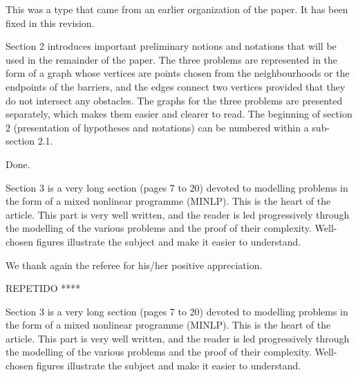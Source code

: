 \documentclass{article}
\newenvironment{reviewer}{\setcounter{pointcounter}{1}}{}
\newcommand{\point}{\text{{\selectfont \thepointcounter} \stepcounter{pointcounter}}}
\newcommand{\JP}[1]{{\color{blue}#1}}
\begin{document}
\begin{reviewer}
		\begin{tcolorbox}[breakable,enhanced,coltitle=black,colback=green!5!white,colframe=green!75!black,title=\textbf{Answer R2.\point},borderline={1pt}{0pt}{black},boxrule=0pt]
		This was a type that came from an earlier organization of the paper. It has been fixed in this revision.

		\end{tcolorbox}
		
		\begin{itshape}
			Section 2 introduces important preliminary notions and notations that will be used in the remainder of the paper. The three problems are represented in the form of a graph whose vertices are points chosen from the neighbourhoods or the endpoints of the barriers, and the edges connect two vertices provided that they do not intersect any obstacles. The graphs for the three problems are presented separately, which makes them easier and clearer to read. The beginning of section 2 (presentation of hypotheses and notations) can be numbered within a sub-section 2.1.
		\end{itshape}
		
		\begin{tcolorbox}[breakable,enhanced,coltitle=black,colback=green!5!white,colframe=green!75!black,title=\textbf{Answer R2.\point},borderline={1pt}{0pt}{black},boxrule=0pt]
		Done.

		\end{tcolorbox}
		
		\begin{itshape}
			Section 3 is a very long section (pages 7 to 20) devoted to modelling problems in the form of a mixed nonlinear programme (MINLP). This is the heart of the article. This part is very well written, and the reader is led progressively through the modelling of the various problems and the proof of their complexity. Well-chosen figures illustrate the subject and make it easier to understand.
		\end{itshape}
		We thank again the referee for his/her positive  appreciation.

		\begin{tcolorbox}[breakable,enhanced,coltitle=black,colback=green!5!white,colframe=green!75!black,title=\textbf{Answer R2.\point},borderline={1pt}{0pt}{black},boxrule=0pt]

		\end{tcolorbox}
		
\JP{REPETIDO ****		\begin{itshape}
			Section 3 is a very long section (pages 7 to 20) devoted to modelling problems in the form of a mixed nonlinear programme (MINLP). This is the heart of the article. This part is very well written, and the reader is led progressively through the modelling of the various problems and the proof of their complexity. Well-chosen figures illustrate the subject and make it easier to understand.
		\end{itshape}
				
}
\end{reviewer}
\end{document}
